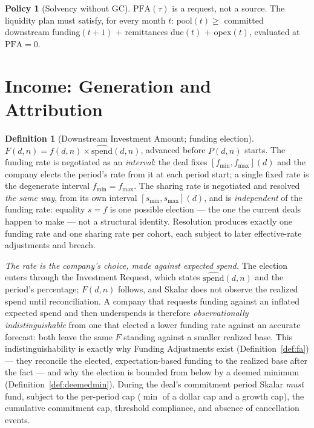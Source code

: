 \documentclass[11pt, a4paper]{article}
\theoremstyle{definition}
\newtheorem{definition}{Definition}[section]
\newtheorem{policy}{Policy}
\newcommand{\src}[1]{}
\newcommand{\KCIA}{downstream agreement}
\newcommand{\FudoTS}{downstream term sheet}
\newcommand{\PFA}{\mathrm{PFA}}                   %
\newcommand{\pool}{\mathrm{pool}}                 %
\newcommand{\espend}{\widehat{\mathrm{spend}}}    %
\begin{document}
\begin{policy}[Solvency without GC]\label{pol:solvency}
$\PFA(\tau)$ is a request, not a source. The liquidity plan must satisfy, for every month $t$:
$\pool(t) \geq$ committed downstream funding$(t{+}1)$ $+$ remittances due$(t)$ $+$ opex$(t)$, evaluated at $\PFA = 0$.
\end{policy}

\section{Income: Generation and Attribution}\label{sec:income}

\begin{definition}[Downstream Investment Amount; funding election]\label{def:fdown}
$F(d, n) = f(d, n) \times \espend(d, n)$, advanced before $P(d,n)$ starts. The funding rate is negotiated as an \emph{interval}: the deal fixes $[f_{\min}, f_{\max}](d)$ and the company elects the period's rate from it at each period start; a single fixed rate is the degenerate interval $f_{\min} = f_{\max}$. The sharing rate is negotiated and resolved \emph{the same way}, from its own interval $[s_{\min}, s_{\max}](d)$, and is \emph{independent} of the funding rate: equality $s = f$ is one possible election --- the one the current deals happen to make --- not a structural identity. Resolution produces exactly one funding rate and one sharing rate per cohort, each subject to later effective-rate adjustments and breach.

\emph{The rate is the company's choice, made against expected spend.} The election enters through the Investment Request, which states $\espend(d,n)$ and the period's percentage; $F(d,n)$ follows, and Skalar does not observe the realized spend until reconciliation. A company that requests funding against an inflated expected spend and then underspends is therefore \emph{observationally indistinguishable} from one that elected a lower funding rate against an accurate forecast: both leave the same $F$ standing against a smaller realized base. This indistinguishability is exactly why Funding Adjustments exist (Definition~\ref{def:fa}) --- they reconcile the elected, expectation-based funding to the realized base after the fact --- and why the election is bounded from below by a deemed minimum (Definition~\ref{def:deemedmin}). During the deal's commitment period Skalar \emph{must} fund, subject to the per-period cap ($\min$ of a dollar cap and a growth cap), the cumulative commitment cap, threshold compliance, and absence of cancellation events.
\src{Template: \KCIA{} \S2.1, Sch.~A \S2.1(a)--(c) (fixed percentage); \FudoTS{} ``Funding Amount'' (band, company-elected per period).}
\end{definition}
\end{document}
